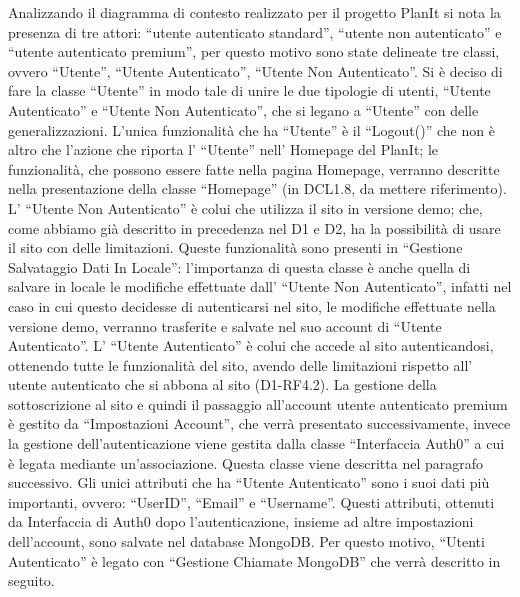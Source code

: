 \begin{listaPersonale}[DCL]{}

    Analizzando il diagramma di contesto realizzato per il progetto PlanIt si nota la presenza di tre attori: “utente autenticato standard”, “utente non autenticato” e “utente autenticato premium”, per questo motivo sono state delineate tre classi, ovvero “Utente”, “Utente Autenticato”, “Utente Non Autenticato”.
    Si è deciso di fare la classe “Utente” in modo tale di unire le due tipologie di utenti, “Utente Autenticato” e “Utente Non Autenticato”, che si legano a “Utente” con delle generalizzazioni. L'unica funzionalità che ha “Utente” è il “Logout()” che non è altro che l'azione che riporta l' “Utente” nell' Homepage del PlanIt; le funzionalità, che possono essere fatte nella pagina Homepage, verranno descritte nella presentazione della classe “Homepage” (in DCL1.8, da mettere riferimento).
    L' “Utente Non Autenticato” è colui che utilizza il sito in versione demo; che, come abbiamo già descritto in precedenza nel D1 e D2, ha la possibilità di usare il sito con delle limitazioni. Queste funzionalità sono presenti in “Gestione Salvataggio Dati In Locale”: l'importanza di questa classe è anche quella di salvare in locale le modifiche effettuate dall' “Utente Non Autenticato”, infatti nel caso in cui questo decidesse di autenticarsi nel sito, le modifiche effettuate nella versione demo, verranno trasferite e salvate nel suo account di “Utente Autenticato”.
    L' “Utente Autenticato” è colui che accede al sito autenticandosi, ottenendo tutte le funzionalità del sito, avendo delle limitazioni rispetto all' utente autenticato che si abbona al sito (D1-RF4.2). La gestione della sottoscrizione al sito e quindi il passaggio all'account utente autenticato premium è gestito da “Impostazioni Account”, che verrà presentato successivamente, invece la gestione dell'autenticazione viene gestita dalla classe “Interfaccia Auth0” a cui è legata mediante un'associazione. Questa classe viene descritta nel paragrafo successivo. Gli unici attributi che ha “Utente Autenticato” sono i suoi dati più importanti, ovvero: “UserID”, “Email” e “Username”. Questi attributi, ottenuti da Interfaccia di Auth0 dopo l'autenticazione, insieme ad altre impostazioni dell'account, sono salvate nel database MongoDB. Per questo motivo, “Utenti Autenticato” è legato con “Gestione Chiamate MongoDB” che verrà descritto in seguito.






\end{listaPersonale}

